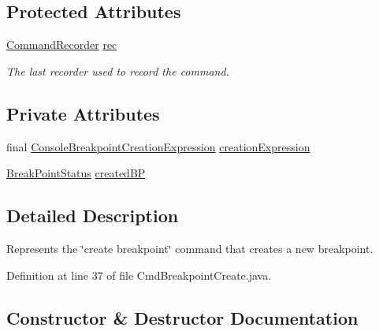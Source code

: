\subsection*{Protected Attributes}
\begin{DoxyCompactItemize}
\item 
\hyperlink{classgov_1_1nasa_1_1jpf_1_1inspector_1_1client_1_1_command_recorder}{Command\+Recorder} \hyperlink{classgov_1_1nasa_1_1jpf_1_1inspector_1_1client_1_1_client_command_af4246f2427035c72a6af45a2c61361f7}{rec}
\begin{DoxyCompactList}\small\item\em The last recorder used to record the command. \end{DoxyCompactList}\end{DoxyCompactItemize}
\subsection*{Private Attributes}
\begin{DoxyCompactItemize}
\item 
final \hyperlink{classgov_1_1nasa_1_1jpf_1_1inspector_1_1client_1_1commands_1_1_cmd_breakpoint_create_1_1_console_breakpoint_creation_expression}{Console\+Breakpoint\+Creation\+Expression} \hyperlink{classgov_1_1nasa_1_1jpf_1_1inspector_1_1client_1_1commands_1_1_cmd_breakpoint_create_a5b4a48a9d6bb14f38d3abdccd3b0acb1}{creation\+Expression}
\item 
\hyperlink{interfacegov_1_1nasa_1_1jpf_1_1inspector_1_1interfaces_1_1_break_point_status}{Break\+Point\+Status} \hyperlink{classgov_1_1nasa_1_1jpf_1_1inspector_1_1client_1_1commands_1_1_cmd_breakpoint_create_aad3388a2fbaf06146baf0194cbb77cdf}{created\+BP}
\end{DoxyCompactItemize}


\subsection{Detailed Description}
Represents the \char`\"{}create breakpoint\char`\"{} command that creates a new breakpoint. 

Definition at line 37 of file Cmd\+Breakpoint\+Create.\+java.



\subsection{Constructor \& Destructor Documentation}
